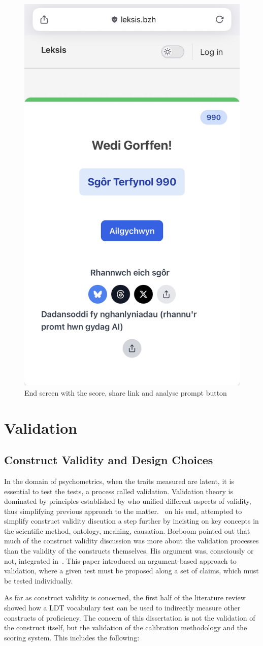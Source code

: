 \begin{figure}[htbp]
    \centering
    \includegraphics[height=0.7\textwidth]{figures/end-screen.jpg}
    \caption{End screen with the score, share link and analyse prompt button}
\end{figure}\label{fig:endscreen}

\section{Validation}
\subsection{Construct Validity and Design Choices}
In the domain of psychometrics, when the traits measured are latent, it is essential to test the tests, a process called validation. Validation theory is dominated by principles established by \textcite{messick_validity_1987} who unified different aspects of validity, thus simplifying previous approach to the matter.\ \textcite{borsboom_concept_2004} on his end, attempted to simplify construct validity discution a step further by incisting on key concepts in the scientific method, ontology, meaning, causation. Borboom pointed out that much of the construct validity discussion was more about the validation processes than the validity of the constructs themselves. His argument was, consciously or not, integrated in~\cite{kane_validating_2013}. This paper introduced an argument-based approach to validation, where a given test must be proposed along a set of claims, which must be tested individually.

As far as construct validity is concerned, the first half of the literature review showed how a LDT vocabulary test can be used to indirectly measure other constructs of proficiency. The concern of this dissertation is not the validation of the construct itself, but the validation of the calibration methodology and the scoring system. This includes the following:

